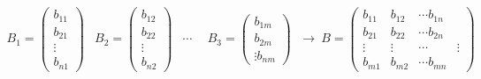 \begin{equation*}
\begin{aligned}
B_1=\begin{pmatrix}
b_{11}\\ b_{21}\\ \vdots \\ b_{n1}
\end{pmatrix}&
B_2=\begin{pmatrix}
b_{12}\\ b_{22}\\ \vdots\\ b_{n2}
\end{pmatrix} &
\cdots  \  \  &
B_3=\begin{pmatrix}
b_{1m}\\ b_{2m}\\ \vdots  b_{nm}
\end{pmatrix}
\end{aligned} \ \rightarrow \ 
B=\begin{pmatrix}
b_{11}& b_{12}& \cdots b_{1n}\\
b_{21}& b_{22}& \cdots b_{2n}\\
\vdots& \vdots& \cdots& \vdots \\
b_{m1}& b_{m2}& \cdots b_{mn}
\end{pmatrix}
\end{equation*}

